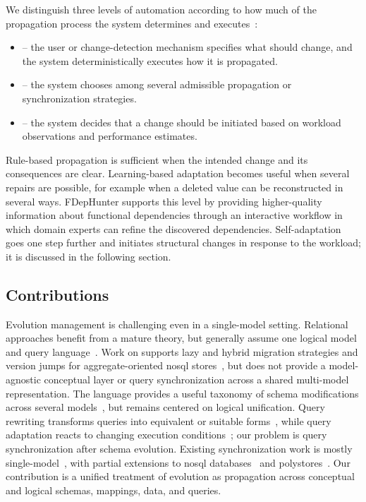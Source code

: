 We distinguish three levels of automation according to how much of the propagation process the system determines and executes~\citep{ideas2022vision}:
\begin{itemize}
    \item {} -- the user or change-detection mechanism specifies what should change, and the system deterministically executes how it is propagated.
    \item {} -- the system chooses among several admissible propagation or synchronization strategies.
    \item {} -- the system decides that a change should be initiated based on workload observations and performance estimates.
\end{itemize}
Rule-based propagation is sufficient when the intended change and its consequences are clear. Learning-based adaptation becomes useful when several repairs are possible, for example when a deleted value can be reconstructed in several ways. FDepHunter supports this level by providing higher-quality information about functional dependencies through an interactive workflow in which domain experts can refine the discovered dependencies. Self-adaptation goes one step further and initiates structural changes in response to the workload; it is discussed in the following section.

\subsection{Contributions}

Evolution management is challenging even in a single-model setting. Relational approaches benefit from a mature theory, but generally assume one logical model and query language~\citep{spivak2015relational}. Work on  supports lazy and hybrid migration strategies and version jumps for aggregate-oriented \acrshort{nosql} stores~\citep{storl2022darwin}, but does not provide a model-agnostic conceptual layer or query synchronization across a shared multi-model representation. The  language provides a useful taxonomy of schema modifications across several models~\citep{DBLP:conf/er/ChillonRM21a, 10.1109/TKDE.2024.3362273}, but remains centered on logical unification. Query rewriting transforms queries into equivalent or suitable forms~\citep{10.1007/s00778-021-00676-3}, while query adaptation reacts to changing execution conditions~\citep{10.5555/1331939.1331940}; our problem is query synchronization after schema evolution. Existing synchronization work is mostly single-model~\citep{10.14778/1921071.1921078}, with partial extensions to \acrshort{nosql} databases~\citep{DBLP:conf/er/MollerKHS19} and polystores~\citep{9252014}. Our contribution is a unified treatment of evolution as propagation across conceptual and logical schemas, mappings, data, and queries.

